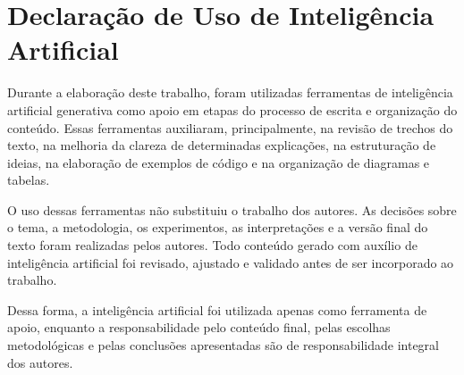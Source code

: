 \chapter{Declaração de Uso de Inteligência Artificial}

Durante a elaboração deste trabalho, foram utilizadas ferramentas de inteligência artificial generativa como apoio em etapas do processo de escrita e organização do conteúdo. Essas ferramentas auxiliaram, principalmente, na revisão de trechos do texto, na melhoria da clareza de determinadas explicações, na estruturação de ideias, na elaboração de exemplos de código e na organização de diagramas e tabelas.

O uso dessas ferramentas não substituiu o trabalho dos autores. As decisões sobre o tema, a metodologia, os experimentos, as interpretações e a versão final do texto foram realizadas pelos autores. Todo conteúdo gerado com auxílio de inteligência artificial foi revisado, ajustado e validado antes de ser incorporado ao trabalho.

Dessa forma, a inteligência artificial foi utilizada apenas como ferramenta de apoio, enquanto a responsabilidade pelo conteúdo final, pelas escolhas metodológicas e pelas conclusões apresentadas são de responsabilidade integral dos autores.
